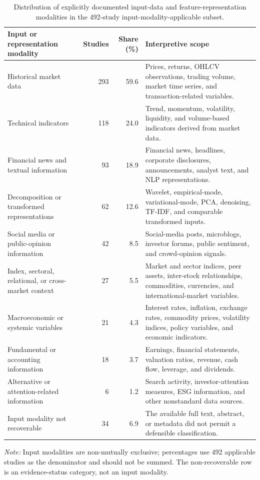 \begin{table}[!t]
\centering
\caption{Distribution of explicitly documented input-data and feature-representation modalities in the 492-study input-modality-applicable subset.}
\label{tab:section6-input-modalities}
\small
\begin{tabularx}{\textwidth}{@{}p{4.1cm}rrX@{}}
\toprule
Input or representation modality & Studies & Share (\%) & Interpretive scope \\
\midrule
Historical market data & 293 & 59.6 & Prices, returns, OHLCV observations, trading volume, market time series, and transaction-related variables. \\
Technical indicators & 118 & 24.0 & Trend, momentum, volatility, liquidity, and volume-based indicators derived from market data. \\
Financial news and textual information & 93 & 18.9 & Financial news, headlines, corporate disclosures, announcements, analyst text, and NLP representations. \\
Decomposition or transformed representations & 62 & 12.6 & Wavelet, empirical-mode, variational-mode, PCA, denoising, TF-IDF, and comparable transformed inputs. \\
Social media or public-opinion information & 42 & 8.5 & Social-media posts, microblogs, investor forums, public sentiment, and crowd-opinion signals. \\
Index, sectoral, relational, or cross-market context & 27 & 5.5 & Market and sector indices, peer assets, inter-stock relationships, commodities, currencies, and international-market variables. \\
Macroeconomic or systemic variables & 21 & 4.3 & Interest rates, inflation, exchange rates, commodity prices, volatility indices, policy variables, and economic indicators. \\
Fundamental or accounting information & 18 & 3.7 & Earnings, financial statements, valuation ratios, revenue, cash flow, leverage, and dividends. \\
Alternative or attention-related information & 6 & 1.2 & Search activity, investor-attention measures, ESG information, and other nonstandard data sources. \\
Input modality not recoverable & 34 & 6.9 & The available full text, abstract, or metadata did not permit a defensible classification. \\
\bottomrule
\end{tabularx}
\begin{minipage}{\textwidth}\footnotesize \textit{Note:} Input modalities are non-mutually exclusive; percentages use 492 applicable studies as the denominator and should not be summed. The non-recoverable row is an evidence-status category, not an input modality.\end{minipage}
\end{table}
